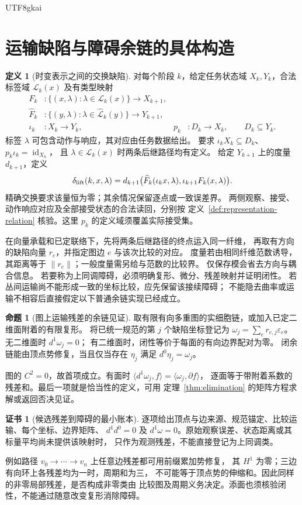 \documentclass[12pt]{report}
\makeatletter
\theoremstyle{definition}
\newtheorem{definition}{定义}[chapter]
\newtheorem{proposition}{命题}[chapter]
\newtheorem{Certificate}{证书}[chapter]
\renewenvironment{proof}[1][\proofname]{\par
  \pushQED{\qed}\normalfont
  \topsep6\p@\@plus6\p@\relax
  \trivlist
  \item[\hskip\labelsep\normalfont #1\@addpunct{.}]\ignorespaces
}{
  \popQED\endtrivlist\@endpefalse
}
\newcommand{\id}{\operatorname{id}}
\makeatother
\begin{document}
\begin{CJK*}{UTF8}{gkai}
\section{运输缺陷与障碍余链的具体构造}
\begin{definition}[时变表示之间的交换缺陷]
\label{def:representation-defect}
对每个阶段 \(k\)，给定任务状态域 \(X_k,Y_k\)，合法标签域
\(\mathcal L_k(x)\) 及有类型映射
\[
\begin{aligned}
F_k&:\{(x,\lambda):\lambda\in\mathcal L_k(x)\}\to X_{k+1},\\
\widehat F_k&:\{(y,\lambda):\lambda\in\widehat{\mathcal L}_k(y)\}\to Y_{k+1},\\
\iota_k&:X_k\to Y_k,&p_k&:D_k\to X_k,\qquad D_k\subseteq Y_k.
\end{aligned}
\]
标签 \(\lambda\) 可包含动作与响应，其对应由任务数据给出。
要求 \(\iota_kX_k\subseteq D_k\)、\(p_k\iota_k=\id_{X_k}\)，
且 \(\lambda\in\mathcal L_k(x)\) 时两条后继路径均有定义。
给定 \(Y_{k+1}\) 上的度量 \(d_{k+1}\)，定义
\[
\delta_{\rm lift}(k,x,\lambda)=
d_{k+1}\bigl(\widehat F_k(\iota_kx,\lambda),\iota_{k+1}F_k(x,\lambda)\bigr).
\]
精确交换要求该量恒为零；其余情况保留逐点或一致误差界。
两侧观察、接受、动作响应对应及全部接受状态的合法读回，分别按
定义~\ref{def:representation-relation} 核验。这里 \(p_k\) 的定义域须覆盖实际接受集。
\end{definition}
在向量承载和已定联络下，先将两条后继路径的终点运入同一纤维，
再取有方向的缺陷向量 \(r_e\)，并指定图边 \(e\) 与该次比较的对应。
度量若由相同纤维范数诱导，其距离等于 \(\|r_e\|\)；一般度量需另给与范数的比较界。
仅保存模会省去方向与耦合信息。
若要称为上同调障碍，必须明确复形、微分、残差映射并证明闭性。
若丛间运输尚不能形成一致的坐标比较，应先保留该接续障碍；
不能隐去曲率或运输不相容后直接假定以下普通余链实现已经成立。


\begin{proposition}[图上运输残差的余链见证]
\label{prop:cochain-residual}
取有限有向多重图的实细胞链，或加入已定二维面附着的有限复形。
将已统一规范的第 \(j\) 个缺陷坐标登记为
\(\omega_j=\sum_e r_{e,j}\varepsilon_e\)。无二维面时 \(d^1\omega_j=0\)；
有二维面时，闭性等价于每面的有向边界配对为零。
闭余链能由顶点势修复，当且仅当存在 \(\eta_j\) 满足 \(d^0\eta_j=\omega_j\)。
\end{proposition}
\begin{proof}
图的 \(C^2=0\)，故首项成立。有面时
\(\langle d^1\omega_j,f\rangle=\langle\omega_j,\partial f\rangle\)，
逐面等于带附着系数的残差和。最后一项就是恰当性的定义，可用
定理~\ref{thm:elimination} 的矩阵方程求解或返回否决见证。
\end{proof}
\begin{Certificate}[候选残差到障碍的最小账本]
逐项给出顶点与边来源、规范锚定、比较运输、每个坐标、边界矩阵、
\(d^1d^0=0\) 及 \(d^1\omega=0\)。原始观察误差、状态距离或其标量平均尚未提供该映射时，
只作为观测残差，不能直接登记为上同调类。
\end{Certificate}
例如路径 \(v_0\to\cdots\to v_n\) 上任意边残差都可用前缀累加势修复，
其 \(H^1\) 为零；三边有向环上各残差均为一时，周期和为三，
不可能等于顶点势的伸缩和。因此同样的非零局部残差，是否构成非零类由
比较图及周期义务决定。添面也须核验闭性，不能通过随意改变复形消除障碍。


\end{CJK*}
\end{document}
